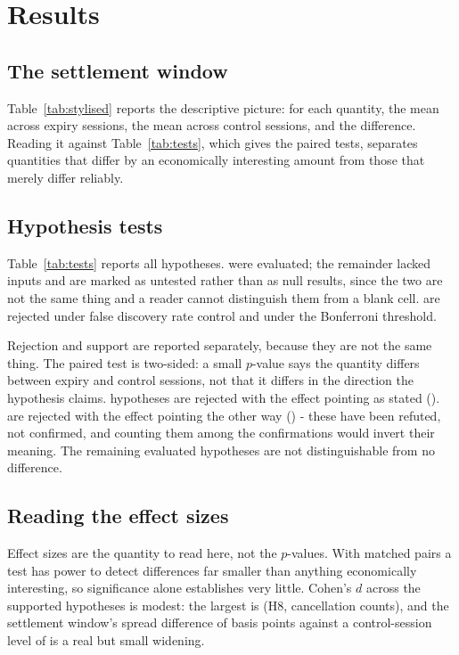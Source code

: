 \documentclass[11pt,a4paper]{article}
\begin{document}
\section{Results}\label{sec:results}

\subsection{The settlement window}

Table~\ref{tab:stylised} reports the descriptive picture: for each quantity, the mean across
expiry sessions, the mean across control sessions, and the difference. Reading it against
Table~\ref{tab:tests}, which gives the paired tests, separates quantities that differ by an
economically interesting amount from those that merely differ reliably.

\subsection{Hypothesis tests}

Table~\ref{tab:tests} reports all \TestSpecified{} hypotheses. \TestEvaluated{} were
evaluated; the remainder lacked inputs and are marked as untested rather than as null
results, since the two are not the same thing and a reader cannot distinguish them from a
blank cell. \TestRejectedFdr{} are rejected under false discovery rate control and
\TestRejectedBonferroni{} under the Bonferroni threshold.

Rejection and support are reported separately, because they are not the same thing. The
paired test is two-sided: a small $p$-value says the quantity differs between expiry and
control sessions, not that it differs in the direction the hypothesis claims.
\TestSupported{} hypotheses are rejected with the effect pointing as stated
(\TestSupportedIds{}). \TestContradicted{} are rejected with the effect pointing the other
way (\TestContradictedIds{}) - these have been refuted, not confirmed, and counting them
among the confirmations would invert their meaning. The remaining \TestNotRejected{}
evaluated hypotheses are not distinguishable from no difference.

\subsection{Reading the effect sizes}

Effect sizes are the quantity to read here, not the $p$-values. With \TestPairsTotal{}
matched pairs a test has power to detect differences far smaller than anything economically
interesting, so significance alone establishes very little. Cohen's $d$ across the supported
hypotheses is modest: the largest is \HHEightEffectSizeCohenD{} (H8, cancellation counts),
and the settlement window's spread difference of \SpreadMeanBpsDiff{} basis points against a
control-session level of \SpreadMeanBpsControl{} is a real but small widening.
\end{document}

